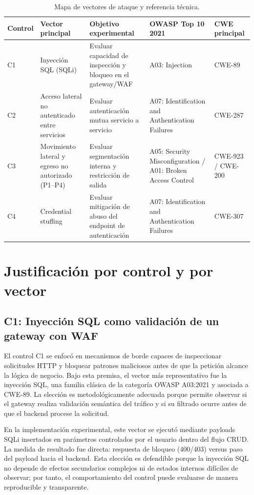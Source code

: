 \begin{table}[htbp]
\centering
\small
\caption{Mapa de vectores de ataque y referencia técnica.}
\label{tab:mapa-vectores-ataque}
\begin{tabular}{p{1.0cm}p{3.1cm}p{3.2cm}p{2.5cm}p{3.0cm}}
\toprule
Control & Vector principal & Objetivo experimental & OWASP Top 10 2021 & CWE principal \\
\midrule
C1 & Inyección SQL (SQLi) & Evaluar capacidad de inspección y bloqueo en el gateway/WAF & A03: Injection & CWE-89 \\
C2 & Acceso lateral no autenticado entre servicios & Evaluar autenticación mutua servicio a servicio & A07: Identification and Authentication Failures & CWE-287 \\
C3 & Movimiento lateral y egreso no autorizado (P1--P4) & Evaluar segmentación interna y restricción de salida & A05: Security Misconfiguration / A01: Broken Access Control & CWE-923 / CWE-200 \\
C4 & Credential stuffing & Evaluar mitigación de abuso del endpoint de autenticación & A07: Identification and Authentication Failures & CWE-307 \\
\bottomrule
\end{tabular}
\end{table}

\section{Justificación por control y por vector}

\subsection{C1: Inyección SQL como validación de un gateway con WAF}

El control C1 se enfocó en mecanismos de borde capaces de inspeccionar solicitudes HTTP y bloquear patrones maliciosos antes de que la petición alcance la lógica de negocio. Bajo esta premisa, el vector más representativo fue la inyección SQL, una familia clásica de la categoría OWASP A03:2021 y asociada a CWE-89. La elección es metodológicamente adecuada porque permite observar si el gateway realiza validación semántica del tráfico y si su filtrado ocurre antes de que el backend procese la solicitud.

En la implementación experimental, este vector se ejecutó mediante payloads SQLi insertados en parámetros controlados por el usuario dentro del flujo CRUD. La medida de resultado fue directa: respuesta de bloqueo (400/403) versus paso del payload hacia el backend. Esta elección es defendible porque la inyección SQL no depende de efectos secundarios complejos ni de estados internos difíciles de observar; por tanto, el comportamiento del control puede evaluarse de manera reproducible y transparente.

